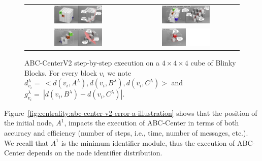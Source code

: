 \begin{figure}[!h]
	\centering
	\begin{tabular}{c c}
		\includegraphics[width=0.475\textwidth]{images/centrality/abc-centerv2-cube/step1.png} & 
		\includegraphics[width=0.475\textwidth]{images/centrality/abc-centerv2-cube/step2.png}\\
		\includegraphics[width=0.475\textwidth]{images/centrality/abc-centerv2-cube/step3.png} &
		\includegraphics[width=0.475\textwidth]{images/centrality/abc-centerv2-cube/step4.png}
	\end{tabular}	
	\caption{ABC-CenterV2 step-by-step execution on a ${4\times4\times4}$ cube of Blinky Blocks. For every block $v_i$ we note $d^\lambda_{v_i} =\ {<}d(v_i,A^\lambda),d(v_i,B^\lambda),d(v_i,C^\lambda){>}$ and $g^\lambda_{v_i} =\ |d(v_i,B^\lambda) - d(v_i,C^\lambda)|$. \label{fig:centrality:abc-etape-illustration}}	
\end{figure}

Figure~\ref{fig:centrality:abc-center-v2-error-a-illustration} shows that the position of the initial node, $A^1$, impacts the execution of ABC-Center in terms of both accuracy and efficiency (number of steps, i.e., time, number of messages, etc.). We recall that $A^1$ is the minimum identifier module, thus the execution of ABC-Center depends on the node identifier distribution.

